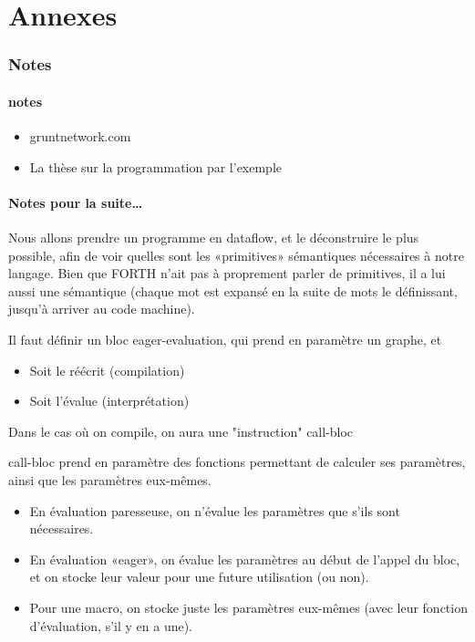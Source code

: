 \documentclass{article}
\begin{document}
\appendix

\part{Annexes}
\section{Notes}
\subsection{notes}
\begin{itemize}
\item gruntnetwork.com
\item La thèse sur la programmation par l'exemple
\end{itemize}

\subsection{Notes pour la suite\dots}




Nous allons prendre un programme en dataflow, et le déconstruire le plus possible, afin de voir quelles sont les «primitives» sémantiques nécessaires à notre langage. Bien que FORTH n'ait pas à proprement parler de primitives, il a lui aussi une sémantique (chaque mot est expansé en la suite de mots le définissant, jusqu'à arriver au code machine).
  

Il faut définir un bloc eager-evaluation, qui prend en paramètre un graphe, et
\begin{itemize}
\item Soit le réécrit (compilation)
\item Soit l'évalue (interprétation)
\end{itemize}
Dans le cas où on compile, on aura une "instruction" call-bloc

call-bloc prend en paramètre des fonctions permettant de calculer ses paramètres, ainsi que les paramètres eux-mêmes.
\begin{itemize}
\item En évaluation paresseuse, on n'évalue les paramètres que s'ils sont nécessaires.
\item En évaluation «eager», on évalue les paramètres au début de l'appel du bloc, et on stocke leur valeur pour une future utilisation (ou non).
\item Pour une macro, on stocke juste les paramètres eux-mêmes (avec leur fonction d'évaluation, s'il y en a une).
\end{itemize}


\nocite{*}


\end{document}
